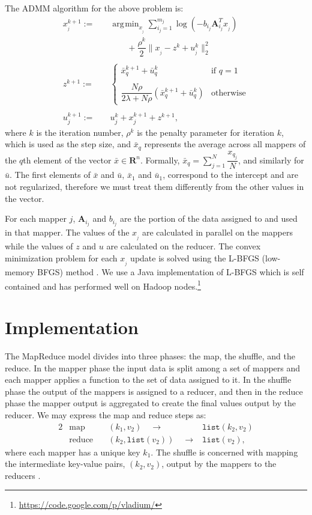 \documentclass[10pt, conference, compsocconf]{IEEEtran}
\DeclareMathOperator*{\argmin}{arg\!\min}
\begin{document}
The ADMM algorithm for the above problem is:
\begin{align}
\label{eq:x}
x_{_j}^{k+1} :=&\quad \argmin_{x_{_j}} \sum_{i_j=1}^{m_j} \log(-b_{i_j}\mathbf{A}_{i_j}^Tx_{_j}) \\
&\quad\quad\quad+ \dfrac{\rho^k}{2}\|x_{_j} - z^k + u_{_j}^k\|_2^2 \nonumber\\
\nonumber\\
\label{eq:z}
z^{k+1} :=&\quad \begin{cases}
    \bar{x}_q^{k+1} + \bar{u}_q^k& \text{if $q=1$}\\
    \\
    \dfrac{N\rho}{2\lambda + N\rho}(\bar{x}_q^{k+1} + \bar{u}_q^k)& \text{otherwise}
  \end{cases}\\
\nonumber\\
\label{eq:u}
u_j^{k+1} :=&\quad u_j^k + x_j^{k+1} + z^{k+1},
\end{align}
where $k$ is the iteration number, $\rho^k$ is the penalty parameter for iteration $k$, which is used as the step size, and $\bar{x}_q$ represents the average across all mappers of the $q$th element of the vector $\bar{x}\in\mathbf{R}^n$.  Formally, $\bar{x}_q = \sum_{j=1}^N \dfrac{x_{q_j}}{N}$, and similarly for $\bar{u}$.  The first elements of $\bar{x}$ and $\bar{u}$, $\bar{x}_1$ and $\bar{u}_1$, correspond to the intercept and are not regularized, therefore we must treat them differently from the other values in the vector.

For each mapper $j$, $\mathbf{A}_{i_j}$ and $b_{i_j}$ are the portion of the data assigned to and used in that mapper.  The values of the $x_{_j}$ are calculated in parallel on the mappers while the values of $z$ and $u$ are calculated on the reducer.  The convex minimization problem for each $x_{_j}$ update is solved using the L-BFGS (low-memory BFGS) method \cite{bonnans2003numerical}.  We use a Java implementation of L-BFGS which is self contained and has performed well on Hadoop nodes.\footnote{\url{https://code.google.com/p/vladium/}}

\section{Implementation}
The MapReduce model divides into three phases: the map, the shuffle, and the reduce.  In the mapper phase the input data is split among a set of mappers and each mapper applies a function to the set of data assigned to it.  In the shuffle phase the output of the mappers is assigned to a reducer, and then in the reduce phase the mapper output is aggregated to create the final values output by the reducer.  We may express the map and reduce steps as:
\begin{alignat*}{2}
&\text{map}\quad &(k_1,v_2)\quad\rightarrow &\texttt{list}(k_2,v_2)\\
&\text{reduce}\quad &(k_2,\texttt{list}(v_2))\quad\rightarrow &\texttt{list}(v_2),
\end{alignat*}
where each mapper has a unique key $k_1$.  The shuffle is concerned with mapping the intermediate key-value pairs, $(k_2,v_2)$, output by the mappers to the reducers \cite{dean2004}.
\end{document}

